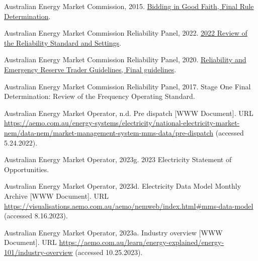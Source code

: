 \documentclass[12pt,a4paper,]{report}
\newlength{\cslhangindent}
\newenvironment{CSLReferences}[2] %
 {%
  \setlength{\parindent}{0pt}
  \ifodd #1 \everypar{\setlength{\hangindent}{\cslhangindent}}\ignorespaces\fi
  \ifnum #2 > 0
  \setlength{\parskip}{#2\baselineskip}
  \fi
 }%
 {}
\begin{document}
\begin{CSLReferences}{1}{0}
\leavevmode{}%
Australian Energy Market Commission, 2015.
\href{https://www.aemc.gov.au/sites/default/files/content/815f277c-a015-47d0-bc13-ce3d5faaf96d/Final-Determination.pdf}{Bidding
in {Good Faith}, {Final Rule Determination}}.

\leavevmode{}%
Australian Energy Market Commission Reliability Panel, 2022.
\href{https://www.aemc.gov.au/sites/default/files/2022-09/2022\%20RSS\%20Review\%20Final\%20Report\%20\%281\%29.pdf}{2022
{Review} of the {Reliability Standard} and {Settings}}.

\leavevmode{}%
Australian Energy Market Commission Reliability Panel, 2020.
\href{https://www.aemc.gov.au/sites/default/files/2020-08/Updated\%20Amended\%20Panel\%20RERT\%20Guidelines\%20-\%2018\%20August\%202020\%20-\%20Final\%20for\%20publication_0.pdf}{Reliability
and {Emergency Reserve Trader Guidelines}, {Final} guidelines}.

\leavevmode{}%
Australian Energy Market Commission Reliability Panel, 2017. Stage {One
Final Determination}: {Review} of the {Frequency Operating Standard}.

\leavevmode{}%
Australian Energy Market Operator, n.d. Pre dispatch {[}WWW Document{]}.
URL
\url{https://aemo.com.au/energy-systems/electricity/national-electricity-market-nem/data-nem/market-management-system-mms-data/pre-dispatch}
(accessed 5.24.2022).

\leavevmode{}%
Australian Energy Market Operator, 2023g. 2023 {Electricity Statement}
of {Opportunities}.

\leavevmode{}%
Australian Energy Market Operator, 2023d. Electricity {Data Model
Monthly Archive} {[}WWW Document{]}. URL
\url{https://visualisations.aemo.com.au/aemo/nemweb/index.html\#mms-data-model}
(accessed 8.16.2023).

\leavevmode{}%
Australian Energy Market Operator, 2023a. Industry overview {[}WWW
Document{]}. URL
\url{https://aemo.com.au/learn/energy-explained/energy-101/industry-overview}
(accessed 10.25.2023).


\end{CSLReferences}
\end{document}
